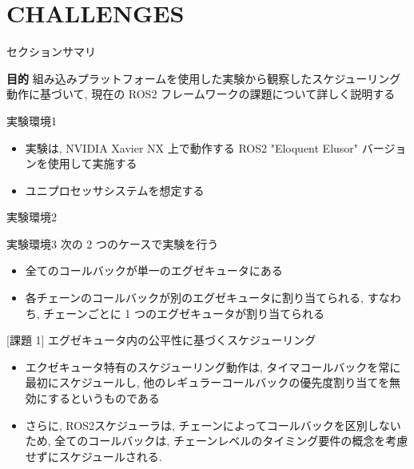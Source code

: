 
\section{CHALLENGES}
\label{sec: challenges}

\begin{frame}{セクションサマリ}
    \begin{itembox}[l]{\textbf{目的}}
        組み込みプラットフォームを使用した実験から観察したスケジューリング動作に基づいて, 現在の ROS2 フレームワークの課題について詳しく説明する
    \end{itembox}
\end{frame}

\begin{frame}{実験環境1}
    \begin{itemize}
        \item 実験は, NVIDIA Xavier NX 上で動作する ROS2 "Eloquent Elusor" バージョンを使用して実施する
        \item ユニプロセッサシステムを想定する
    \end{itemize}
\end{frame}

\begin{frame}{実験環境2}
\end{frame}

\begin{frame}{実験環境3}
    次の 2 つのケースで実験を行う
    \begin{itemize}
        \item 全てのコールバックが単一のエグゼキュータにある
        \item 各チェーンのコールバックが別のエグゼキュータに割り当てられる, すなわち, チェーンごとに 1 つのエグゼキュータが割り当てられる
    \end{itemize}
\end{frame}

\begin{frame}{[課題 1] エグゼキュータ内の公平性に基づくスケジューリング}
    \begin{itemize}
        \item エクゼキュータ特有のスケジューリング動作は, タイマコールバックを常に最初にスケジュールし, 他のレギュラーコールバックの優先度割り当てを無効にするというものである
        \item さらに, ROS2スケジューラは, チェーンによってコールバックを区別しないため, 全てのコールバックは, チェーンレベルのタイミング要件の概念を考慮せずにスケジュールされる.
    \end{itemize}
\end{frame}

